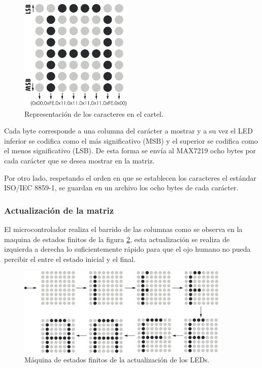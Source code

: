 \begin{figure}[h!]
    \centering
    \includegraphics[width=0.48\textwidth]{imagenes/codificacionAscii.pdf}
    \caption{Representación de los caracteres en el cartel.}
    \label{fig:repAscii}
\end{figure}

Cada byte corresponde a una columna del carácter a mostrar y a su vez el LED inferior se codifica como el más significativo (MSB) y el superior se codifica como el menos significativo (LSB). De esta forma se envía al MAX7219 ocho bytes por cada carácter que se desea mostrar en la matriz.

Por otro lado, respetando el orden en que se establecen los caracteres el estándar ISO/IEC 8859-1, se guardan en un archivo los ocho bytes de cada carácter.

\subsubsection{Actualización de la matriz}

El microcontrolador realiza el barrido de las columnas como se observa en la maquina de estados finitos de la figura \ref{fig:fsm-matriz}, esta actualización se realiza de izquierda a derecha lo suficientemente rápido para que el ojo humano no pueda percibir el entre el estado inicial y el final. 

\begin{figure}[ht!]
	\begin{center}
		\centering
		\includegraphics[width=0.9\textwidth]{imagenes/hw/estados-refresh.pdf}
		\caption{Máquina de estados finitos de la actualización de los LEDs.}
		\label{fig:fsm-matriz}
	\end{center}
\end{figure}

